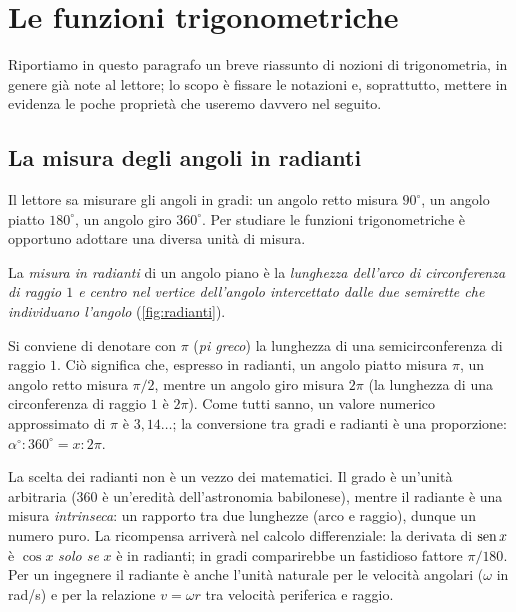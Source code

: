 \section{Le funzioni trigonometriche}
\label{sec:trigonometriche}

Riportiamo in questo paragrafo un breve riassunto di nozioni di trigonometria, in
genere già note al lettore; lo scopo è fissare le notazioni e, soprattutto, mettere in
evidenza le poche proprietà che useremo davvero nel seguito.

\subsection{La misura degli angoli in radianti}

Il lettore sa misurare gli angoli in gradi: un angolo retto misura $90^{\circ}$, un
angolo piatto $180^{\circ}$, un angolo giro $360^{\circ}$. Per studiare le funzioni
trigonometriche è opportuno adottare una diversa unità di misura.

\begin{definizione}[Radiante]
La \emph{misura in radianti} di un angolo piano è la \emph{lunghezza dell'arco di
circonferenza di raggio $1$ e centro nel vertice dell'angolo intercettato dalle due
semirette che individuano l'angolo} (\cref{fig:radianti}).
\end{definizione}

Si conviene di denotare con $\pi$ (\emph{pi greco}) la lunghezza di una
semicirconferenza di raggio $1$. Ciò significa che, espresso in radianti, un angolo
piatto misura $\pi$, un angolo retto misura $\pi/2$, mentre un angolo giro misura
$2\pi$ (la lunghezza di una circonferenza di raggio $1$ è $2\pi$). Come tutti sanno, un
valore numerico approssimato di $\pi$ è $3{,}14\ldots$; la conversione tra gradi e
radianti è una proporzione: $\alpha^{\circ}:360^{\circ}=x:2\pi$.

\begin{idea}
La scelta dei radianti non è un vezzo dei matematici. Il grado è un'unità arbitraria
(360 è un'eredità dell'astronomia babilonese), mentre il radiante è una misura
\emph{intrinseca}: un rapporto tra due lunghezze (arco e raggio), dunque un numero puro.
La ricompensa arriverà nel calcolo differenziale: la derivata di $\operatorname{sen} x$ è $\cos x$
\emph{solo se} $x$ è in radianti; in gradi comparirebbe un fastidioso fattore
$\pi/180$. Per un ingegnere il radiante è anche l'unità naturale per le velocità
angolari ($\omega$ in rad/s) e per la relazione $v=\omega r$ tra velocità periferica e
raggio.
\end{idea}

